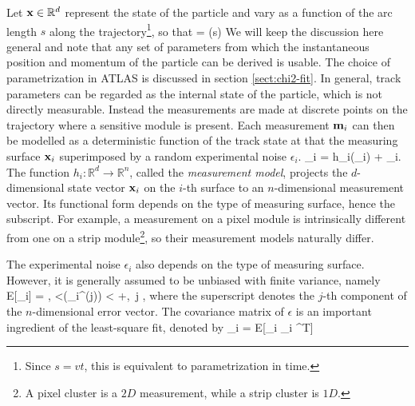 Let $\mathbf{x}\in \mathbb{R}^d$ represent the state of the particle and vary as a function of the arc length $s$ along the trajectory\footnote{Since $s=vt$, this is equivalent to parametrization in time.}, so that 
\beq
\label{eq:track-fit:1}
\bfx = \bfx(s)
\eeq
We will keep the discussion here general and note that any set of parameters from which the instantaneous position and momentum of the particle can be derived is usable. 
The choice of parametrization in ATLAS is discussed in section \ref{sect:chi2-fit}.
In general, track parameters can be regarded as the internal state of the particle, which is not directly measurable.
Instead the measurements are made at discrete points on the trajectory where a sensitive module is present.
Each measurement $\mathbf{m}_i$ can then be modelled as a deterministic function of the track state at that the measuring surface $\mathbf{x}_i$ superimposed by a random experimental noise $\epsilon_i$.
\beq
\label{eq:track-fit:2}
\bfm_i = h_i(\bfx_i) + \epsilon_i.
\eeq
The function $h_i:\mathbb{R}^d \rightarrow \mathbb{R}^n$, called the \textit{measurement model}, projects the $d$-dimensional state vector $\mathbf{x}_i$ on the $i$-th surface to an $n$-dimensional measurement vector. 
Its functional form depends on the type of measuring surface, hence the subscript.
For example, a measurement on a pixel module is intrinsically different from one on a strip module\footnote{A pixel cluster is a $2D$ measurement, while a strip cluster is $1D$.}, so their measurement models naturally differ. 

The experimental noise $\epsilon_i$ also depends on the type of measuring surface. 
However, it is generally assumed to be unbiased with finite variance, namely
\beq
\label{eq:track-fit:3}
E[\epsilon_i] = , <\sigma(\epsilon_i^{(j)}) < +\infty ,\forall \, j \in [n],
\eeq
where the superscript denotes the $j$-th component of the $n$-dimensional error vector.
The covariance matrix of $\epsilon$ is an important ingredient of the least-square fit, denoted by
\beq
\label{eq:track-fit:4}
_i = E[\epsilon_i \epsilon_i ^T]
\eeq


